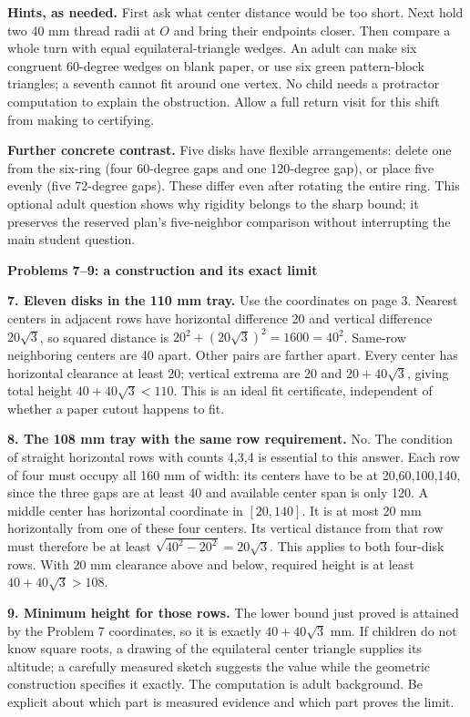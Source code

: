 \documentclass[11pt]{article}
\newcommand{\heading}[1]{\par\textbf{#1}\par}
\begin{document}
\textbf{Hints, as needed.} First ask what center distance would be too short. Next hold two 40 mm thread radii at $O$ and bring their endpoints closer. Then compare a whole turn with equal equilateral-triangle wedges. An adult can make six congruent 60-degree wedges on blank paper, or use six green pattern-block triangles; a seventh cannot fit around one vertex. No child needs a protractor computation to explain the obstruction. Allow a full return visit for this shift from making to certifying.

\textbf{Further concrete contrast.} Five disks have flexible arrangements: delete one from the six-ring (four 60-degree gaps and one 120-degree gap), or place five evenly (five 72-degree gaps). These differ even after rotating the entire ring. This optional adult question shows why rigidity belongs to the sharp bound; it preserves the reserved plan's five-neighbor comparison without interrupting the main student question.
\newpage
\heading{Problems 7--9: a construction and its exact limit}
\textbf{7. Eleven disks in the 110 mm tray.} Use the coordinates on page 3. Nearest centers in adjacent rows have horizontal difference 20 and vertical difference $20\sqrt 3$, so squared distance is $20^2+(20\sqrt 3)^2=1600=40^2$. Same-row neighboring centers are 40 apart. Other pairs are farther apart. Every center has horizontal clearance at least 20; vertical extrema are 20 and $20+40\sqrt 3$, giving total height $40+40\sqrt 3<110$. This is an ideal fit certificate, independent of whether a paper cutout happens to fit.

\textbf{8. The 108 mm tray with the same row requirement.} No. The condition of straight horizontal rows with counts 4,3,4 is essential to this answer. Each row of four must occupy all 160 mm of width: its centers have to be at 20,60,100,140, since the three gaps are at least 40 and available center span is only 120. A middle center has horizontal coordinate in $[20,140]$. It is at most 20 mm horizontally from one of these four centers. Its vertical distance from that row must therefore be at least $\sqrt{40^2-20^2}=20\sqrt 3$. This applies to both four-disk rows. With 20 mm clearance above and below, required height is at least $40+40\sqrt 3>108$.

\textbf{9. Minimum height for those rows.} The lower bound just proved is attained by the Problem 7 coordinates, so it is exactly $40+40\sqrt 3$ mm. If children do not know square roots, a drawing of the equilateral center triangle supplies its altitude; a carefully measured sketch suggests the value while the geometric construction specifies it exactly. The computation is adult background. Be explicit about which part is measured evidence and which part proves the limit.
\end{document}
